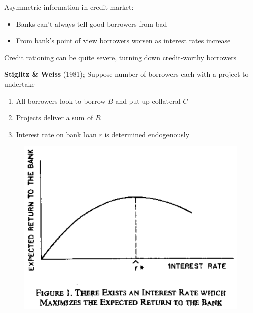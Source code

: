 \documentclass{beamer}
\begin{document}
\begin{frame}
 Asymmetric information in credit market:
\begin{itemize}
  \item Banks can't always tell good borrowers from bad
  \item From bank's point of view borrowers worsen as interest rates increase
\end{itemize}
  \medskip
  Credit rationing can be quite severe, turning down credit-worthy borrowers
\end{frame}

\begin{frame}
 \textbf{Stiglitz \& Weiss} (1981); Suppose number of borrowers each with a project to undertake
\begin{enumerate}
  \item All borrowers look to borrow $B$ and put up collateral $C$
  \item Projects deliver a sum of $R$  
  \item Interest rate on bank loan $r$ is determined endogenously
\end{enumerate}
\end{frame}

\begin{frame}
  \begin{figure}
    \includegraphics{stiglitz_weiss1.eps}
  \end{figure}
\end{frame}
\end{document}
